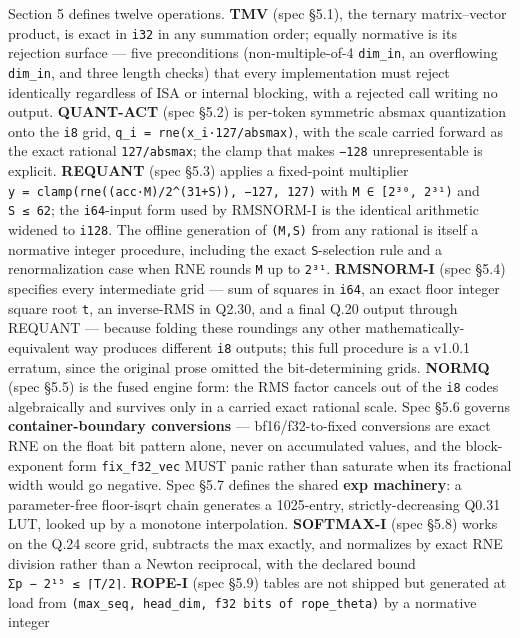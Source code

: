 \documentclass[11pt]{article}
\begin{document}
Section 5 defines twelve operations. \textbf{TMV} (spec §5.1), the ternary matrix--vector product, is exact
in \texttt{i32} in any summation order; equally normative is its rejection surface --- five preconditions
(non-multiple-of-4 \texttt{dim\_in}, an overflowing \texttt{dim\_in}, and three length checks) that every
implementation must reject identically regardless of ISA or internal blocking, with a rejected
call writing no output. \textbf{QUANT-ACT} (spec §5.2) is per-token symmetric absmax quantization onto the
\texttt{i8} grid, \texttt{q\_i\ =\ rne(x\_i·127/absmax)}, with the scale carried forward as the exact rational
\texttt{127/absmax}; the clamp that makes \texttt{−128} unrepresentable is explicit. \textbf{REQUANT} (spec §5.3) applies
a fixed-point multiplier \texttt{y\ =\ clamp(rne((acc·M)/2\^{}(31+S)),\ −127,\ 127)} with \texttt{M\ ∈\ {[}2³⁰,\ 2³¹)} and
\texttt{S\ ≤\ 62}; the \texttt{i64}-input form used by RMSNORM-I is the identical arithmetic widened to \texttt{i128}.
The offline generation of \texttt{(M,S)} from any rational is itself a normative integer procedure,
including the exact \texttt{S}-selection rule and a renormalization case when RNE rounds \texttt{M} up to
\texttt{2³¹}. \textbf{RMSNORM-I} (spec §5.4) specifies every intermediate grid --- sum of squares in \texttt{i64}, an exact
floor integer square root \texttt{t}, an inverse-RMS in Q2.30, and a final Q.20 output through REQUANT ---
because folding these roundings any other mathematically-equivalent way produces different \texttt{i8}
outputs; this full procedure is a v1.0.1 erratum, since the original prose omitted the
bit-determining grids. \textbf{NORMQ} (spec §5.5) is the fused engine form: the RMS factor cancels out of
the \texttt{i8} codes algebraically and survives only in a carried exact rational scale. Spec §5.6 governs
\textbf{container-boundary conversions} --- bf16/f32-to-fixed conversions are exact RNE on the float bit
pattern alone, never on accumulated values, and the block-exponent form \texttt{fix\_f32\_vec} MUST panic
rather than saturate when its fractional width would go negative. Spec §5.7 defines the shared \textbf{exp
machinery}: a parameter-free floor-isqrt chain generates a 1025-entry, strictly-decreasing Q0.31
LUT, looked up by a monotone interpolation. \textbf{SOFTMAX-I} (spec §5.8) works on the Q.24 score grid,
subtracts the max exactly, and normalizes by exact RNE division rather than a Newton reciprocal,
with the declared bound \texttt{\textbar{}Σp\ −\ 2¹⁵\textbar{}\ ≤\ ⌈T/2⌉}. \textbf{ROPE-I} (spec §5.9) tables are not shipped but
generated at load from \texttt{(max\_seq,\ head\_dim,\ f32\ bits\ of\ rope\_theta)} by a normative integer
\end{document}
